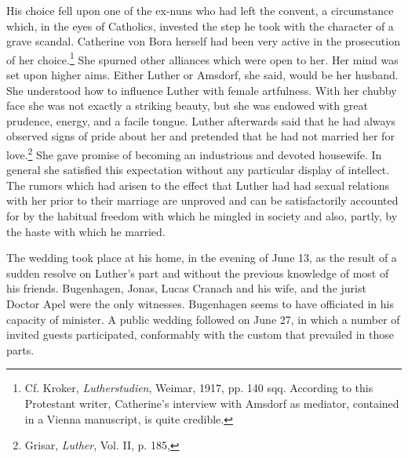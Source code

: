His choice fell upon one of the ex-nuns who had left the convent,
a circumstance which, in the eyes of Catholics, invested the step he
took with the character of a grave scandal. Catherine von Bora herself
had been very active in the prosecution of her choice.\footnote
{Cf. Kroker, \textit{Lutherstudien}, Weimar, 1917, pp. 140 sqq. According to this Protestant
writer, Catherine’s interview with Amsdorf as mediator, contained in a Vienna manuscript,
is quite credible.}
She spurned
other alliances which were open to her. Her mind was set upon higher
aims. Either Luther or Amsdorf, she said, would be her husband. She
understood how to influence Luther with female artfulness. With
her chubby face she was not exactly a striking beauty, but she was
endowed with great prudence, energy, and a facile tongue. Luther
afterwards said that he had always observed signs of pride about her
and pretended that he had not married her for love.\footnote
{Grisar, \textit{Luther}, Vol. II, p. 185,}
She gave
promise of becoming an industrious and devoted housewife. In general
she satisfied this expectation without any particular display of
intellect. The rumors which had arisen to the effect that Luther had
had sexual relations with her prior to their marriage are unproved
and can be satisfactorily accounted for by the habitual freedom with
which he mingled in society and also, partly, by the haste with which
he married.

The wedding took place at his home, in the evening of June 13,
as the result of a sudden resolve on Luther’s part and without the
previous knowledge of most of his friends. Bugenhagen, Jonas, Lucas
Cranach and his wife, and the jurist Doctor Apel were the only witnesses.
Bugenhagen seems to have officiated in his capacity of minister. A public
wedding followed on June 27, in which a number of
invited guests participated, conformably with the custom that prevailed
in those parts.

